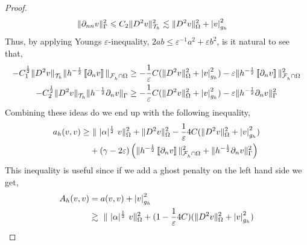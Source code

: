 \begin{proof}
\begin{equation}
\begin{split}
     \|  \partial _{nn}v  \|_{ \Gamma     }^{ 2 } & \leqslant C_{2} \| D^2 v \|_{ \mathcal{T} _{h}  }^{2  } \lesssim    \| D^2 v \|_{ \Omega  }^{ 2 }  + \left\lvert  v  \right\rvert _{ g_{h} }^{2  }
        \end{split}
    \end{equation}
    Thus, by applying Youngs $\varepsilon $-inequality, $2ab \le  \varepsilon^{-1} a^{2} + \varepsilon b^{2} $, is it natural to see that,
    \begin{equation}
        \begin{split}
- C_{1}^{\frac{1}{2}} \| D^2 v    \|_{ \mathcal{T} _{h}   }^{  }  \|h^{-\frac{1}{2}} \left[\!\left[  \partial _{n} v  \right]\!\right]   \|_{ \mathcal{F}^{}_{h}\cap \Omega   }^{  }
& \ge - \frac{1}{\varepsilon } C  (\| D^2 v \|_{ \Omega  }^{ 2 }  + \left\lvert  v  \right\rvert _{ g_{h} }^{2  } ) -  \varepsilon \|h^{-\frac{1}{2}} \left[\!\left[  \partial _{n} v  \right]\!\right]   \|_{ \mathcal{F}^{}_{h}\cap \Omega   }^{2  } \\
- C_{2}^{\frac{1}{2}}  \| D^2 v \|_{ \mathcal{T} _{h} }^{  } \| h^{-\frac{1}{2}}  \partial _{n} v    \|_{ \Gamma    }^{  }
& \ge - \frac{1}{\varepsilon } C  (\| D^2 v \|_{ \Omega  }^{ 2 }  + \left\lvert  v  \right\rvert _{ g_{h} }^{2  } ) -  \varepsilon \|h^{-\frac{1}{2}}  \partial _{n} v    \|_{ \Gamma    }^{2  } \\
        \end{split}
    \end{equation}
    Combining these ideas do we end up with the following inequality,
    \begin{equation}
    \begin{split}
       a_{h}( v,v)  \ge& \     \|\ |\alpha|^{\frac{1}{2}} \  v  \|_{   \Omega   }^{2} +\| D^2v  \|_{   \Omega   }^{2} -  \frac{1}{\varepsilon } 4C  (\| D^2 v \|_{ \Omega  }^{ 2 }  + \left\lvert  v  \right\rvert _{ g_{h} }^{2  } )  \\
                       & + (\gamma - 2\varepsilon  )\left( \|h^{-\frac{1}{2}}  \left[\!\left[  \partial _{n} v  \right]\!\right]\|_{\mathcal{F} _{h}^{} \cap \Omega   }^{ 2 } + \| h^{-\frac{1}{2}} \partial _{n} v \|_{ \Gamma  }^{ 2} \right)        \\
    \end{split}
    \end{equation}
    This inequality is useful since if we add a ghost penalty on the left hand side we get,
    \begin{equation}
        \begin{split}
     A_{h}( v,v) & = a( v,v) + \abs{ v }_{g_{h}}^{2} \\
     & \gtrsim    \   \| \ |\alpha|^{\frac{1}{2}} \  v  \|_{   \Omega   }^{2} + (1  - \frac{1}{\varepsilon } 4C)  (\| D^2 v \|_{ \Omega  }^{ 2 }  + \abs{ v } _{ g_{h} }^{2  } )  \\

\end{split}
\end{equation}
\end{proof}
